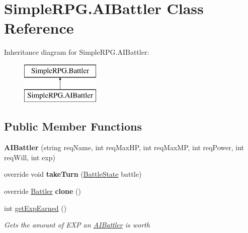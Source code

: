\hypertarget{class_simple_r_p_g_1_1_a_i_battler}{\section{Simple\-R\-P\-G.\-A\-I\-Battler Class Reference}
\label{class_simple_r_p_g_1_1_a_i_battler}
}
Inheritance diagram for Simple\-R\-P\-G.\-A\-I\-Battler\-:\begin{figure}[H]
\begin{center}
\leavevmode
\includegraphics[height=2.000000cm]{class_simple_r_p_g_1_1_a_i_battler}
\end{center}
\end{figure}
\subsection*{Public Member Functions}
\begin{DoxyCompactItemize}
\item 
\hypertarget{class_simple_r_p_g_1_1_a_i_battler_a5343b886da17cdffff98bc39b56a4cf4}{{\bfseries A\-I\-Battler} (string req\-Name, int req\-Max\-H\-P, int req\-Max\-M\-P, int req\-Power, int req\-Will, int exp)}\label{class_simple_r_p_g_1_1_a_i_battler_a5343b886da17cdffff98bc39b56a4cf4}

\item 
\hypertarget{class_simple_r_p_g_1_1_a_i_battler_a3a1f2c68dda706c3a3f347e368275f3e}{override void {\bfseries take\-Turn} (\hyperlink{class_simple_r_p_g_1_1_states_1_1_battle_state}{Battle\-State} battle)}\label{class_simple_r_p_g_1_1_a_i_battler_a3a1f2c68dda706c3a3f347e368275f3e}

\item 
\hypertarget{class_simple_r_p_g_1_1_a_i_battler_a4938f4cfc972d4c6f923ba5e58bb0d9b}{override \hyperlink{class_simple_r_p_g_1_1_battler}{Battler} {\bfseries clone} ()}\label{class_simple_r_p_g_1_1_a_i_battler_a4938f4cfc972d4c6f923ba5e58bb0d9b}

\item 
int \hyperlink{class_simple_r_p_g_1_1_a_i_battler_a803b1a057e75f5a3d3c7c60b8147b6c7}{get\-Exp\-Earned} ()
\begin{DoxyCompactList}\small\item\em Gets the amount of E\-X\-P an \hyperlink{class_simple_r_p_g_1_1_a_i_battler}{A\-I\-Battler} is worth \end{DoxyCompactList}\end{DoxyCompactItemize}
